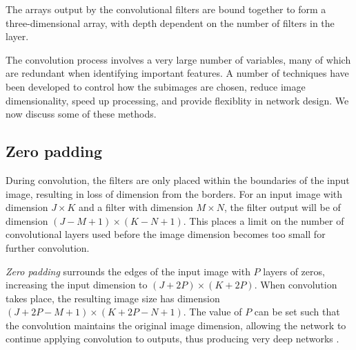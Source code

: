 

The arrays output by the convolutional filters are bound together to form a three-dimensional array, with depth dependent on the number of filters in the layer.

The convolution process involves a very large number of variables, many of which are redundant when identifying important features. A number of techniques have been developed to control how the subimages are chosen, reduce image dimensionality, speed up processing, and provide flexiblity in network design. We now discuss some of these methods.

\subsection*{Zero padding}\label{convnets-pad}

During convolution, the filters are only placed within the boundaries of the input image, resulting in loss of dimension from the borders. For an input image with dimension $J \times K$ and a filter with dimension $M \times N$, the filter output will be of dimension $(J - M + 1)\times (K - N + 1)$. This places a limit on the number of convolutional layers used before the image dimension becomes too small for further convolution.

\textit{Zero padding} surrounds the edges of the input image with $P$ layers of zeros, increasing the input dimension to  $(J+2P) \times (K+2P)$. When convolution takes place, the resulting image size has dimension $(J+2P - M + 1) \times (K + 2P - N + 1)$. The value of $P$ can be set such that the convolution maintains the original image dimension, allowing the network to continue applying convolution to outputs, thus producing very deep networks \cite{GoogLeNet2015}.

